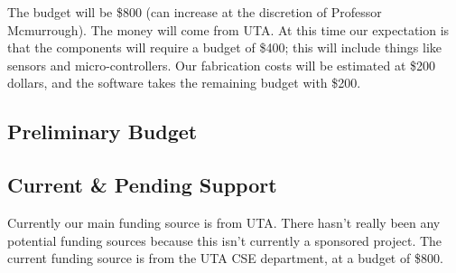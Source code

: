 The budget will be \$800 (can increase at the discretion of Professor Mcmurrough).  The money will come from UTA.  At this time our expectation is that the components will require a budget of \$400; this will include things like sensors and micro-controllers.  Our fabrication costs will be estimated at \$200 dollars, and the software takes the remaining budget with \$200.

\subsection{Preliminary Budget}
\begin{table}[h]
\end{table}

\subsection{Current \& Pending Support}
Currently our main funding source is from UTA.  There hasn't really been any potential funding sources because this isn't currently a sponsored project.  The current funding source is from the UTA CSE department, at a budget of \$800.